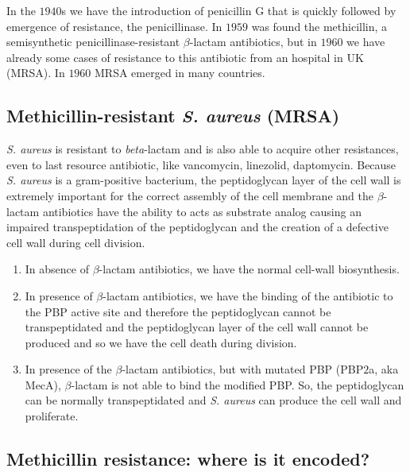 In the $1940$s we have the introduction of penicillin G that is quickly followed by emergence of resistance, the penicillinase. 
In $1959$ was found the methicillin, a semisynthetic penicillinase-resistant $\beta$-lactam antibiotics, but in $1960$ we have already some cases of resistance to this antibiotic from an hospital in UK (MRSA). In $1960$ MRSA emerged in many countries. 

\subsection{Methicillin-resistant \emph{S. aureus} (MRSA)}

\emph{S. aureus} is resistant to \emph{beta}-lactam and is also able to acquire other resistances, even to last resource antibiotic, like vancomycin, linezolid, daptomycin.
Because \emph{S. aureus} is a gram-positive bacterium, the peptidoglycan layer of the cell wall is extremely important for the correct assembly of the cell membrane and the $\beta$-lactam antibiotics have the ability to acts as substrate analog causing an impaired transpeptidation of the peptidoglycan and the creation of a defective cell wall during cell division.

\begin{enumerate}
    \item In absence of $\beta$-lactam antibiotics, we have the normal cell-wall biosynthesis.
    \item In presence of $\beta$-lactam antibiotics, we have the binding of the antibiotic to the PBP active site and therefore the peptidoglycan cannot be transpeptidated and the peptidoglycan layer of the cell wall cannot be produced and so we have the cell death during division. 
    \item In presence of the $\beta$-lactam antibiotics, but with mutated PBP (PBP$2$a, aka MecA), $\beta$-lactam is not able to bind the modified PBP. So, the peptidoglycan can be normally transpeptidated and \emph{S. aureus} can produce the cell wall and proliferate. 
\end{enumerate}

\subsection{Methicillin resistance: where is it encoded?}

